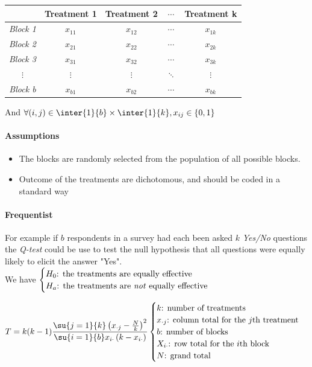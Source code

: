 \begin{center}
    \begin{tabularx}{.65\textwidth}{|*{5}{c|}}
    \hline
     & \textbf{Treatment 1} & \textbf{Treatment 2} & $\cdots$  & \textbf{Treatment k}\\
    \hline
    \emph{Block 1} & $x_{11}$ & $x_{12}$ & $\cdots$  & $x_{1k}$\\
    \hline
    \emph{Block 2} & $x_{21}$ & $x_{22}$ & $\cdots$  & $x_{2k}$\\
    \hline
    \emph{Block 3} & $x_{31}$ & $x_{32}$ & $\cdots$  & $x_{3k}$\\
    \hline
    $\vdots$ & $\vdots$ & $\vdots$ & $\ddots$ & $\vdots$ \\
    \hline
    \emph{Block b} & $x_{b1}$ & $x_{b2}$ & $\cdots$  & $x_{bk}$\\
    \hline
    \end{tabularx}
\end{center}
And $\forall (i,j)\in\inter{1}{b}\times\inter{1}{k}, x_{ij}\in\left\{0, 1\right\}$

\paragraph{Assumptions}
\begin{itemize}
    \item The blocks are randomly selected from the population of all possible blocks.
    \item Outcome of the treatments are dichotomous, and should be coded in a standard way
\end{itemize}

\paragraph{Frequentist}
For example if $b$ respondents in a survey had each been asked $k$ \emph{Yes/No} questions
the \emph{Q-test} could be use to test the null hypothesis that all questions were equally
likely to elicit the answer "Yes".\\
We have
$\begin{cases}
    H_{0}\text{: the treatments are equally effective} \\
    H_{a}\text{: the treatments are \emph{not} equally effective} 
\end{cases}$

\begin{center}
    $
    T = k(k-1)\dfrac{\su{j=1}{k}\left(x_{\cdot j} - \frac{N}{k}\right)^{2}}{
    \su{i=1}{b}x_{i\cdot}\left(k-x_{i\cdot}\right)}
    \begin{cases}
        k\text{: number of treatments} \\
        x_{\cdot j}\text{: column total for the }j\text{th treatment} \\
        b\text{: number of blocks} \\
        X_{i\cdot}\text{: row total for the }i\text{th block} \\
        N\text{: grand total}
         
    \end{cases}$
\end{center}

